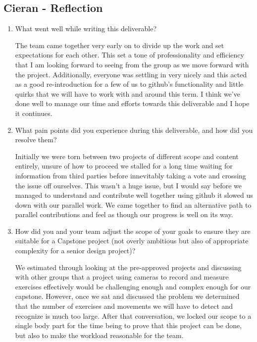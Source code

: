 \documentclass{article}
\begin{document}
\subsection*{Cieran - Reflection}
\begin{enumerate}
    \item What went well while writing this deliverable? 

    The team came together very early on to divide up the work and set expectations for each other. This set a tone of
    professionality and efficiency that I am looking forward to seeing from the group as we move forward with the project.
    Additionally, everyone was settling in very nicely and this acted as a good re-introduction for a few of us to github's
    functionality and little quirks that we will have to work with and around this term. I think we've done well to manage
    our time and efforts towards this deliverable and I hope it continues.

    \item What pain points did you experience during this deliverable, and how
    did you resolve them?

    Initially we were torn between two projects of different scope and content entirely, unsure of how to proceed we
    stalled for a long time waiting for information from third parties before innevitably taking a vote and crossing the
    issue off ourselves. This wasn't a huge issue, but I would say before we managed to understand and contribute well together
    using github it slowed us down with our parallel work. We came together to find an alternative path to parallel contributions
    and feel as though our progress is well on its way.

    \item How did you and your team adjust the scope of your goals to ensure
    they are suitable for a Capstone project (not overly ambitious but also of
    appropriate complexity for a senior design project)?
    
    We estimated through looking at the pre-approved projects and discussing with other groups that a project using cameras to
    record and measure exercises effectively would be challenging enough and complex enough for our capstone. However, once we
    sat and discussed the problem we determined that the number of exercises and movements we will have to detect and recognize
    is much too large. After that conversation, we locked our scope to a single body part for the time being to prove that this
    project can be done, but also to make the workload reasonable for the team.
    
\end{enumerate}  
\end{document}
